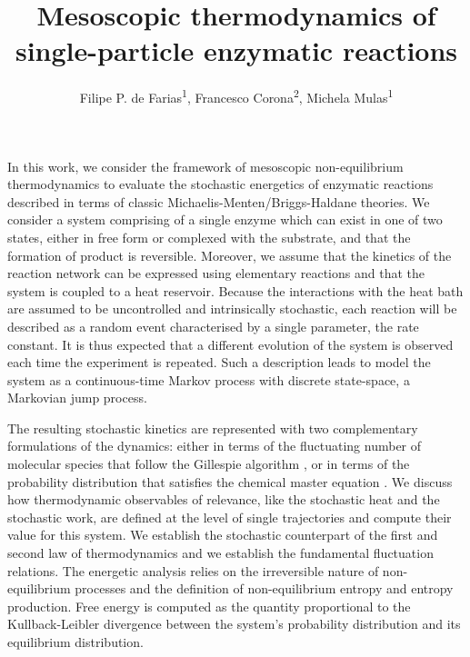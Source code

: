 \documentclass[11pt]{amsart}
\title{Mesoscopic thermodynamics of \\ single-particle enzymatic reactions}
\author{Filipe P. de Farias\textsuperscript{1}, Francesco Corona\textsuperscript{2}, Michela Mulas\textsuperscript{1}}
\begin{document}
\maketitle

\vskip-0.250cm
In this work, we consider the framework of mesoscopic non-equilibrium thermodynamics \cite{Prigogine1953,Mazur1998,Reguera2005} to evaluate the stochastic energetics of enzymatic reactions described in terms of classic Michaelis-Menten/Briggs-Haldane theories. We consider a system comprising of a single enzyme which can exist in one of two states, either in free form or complexed with the substrate, and that the formation of product is reversible. Moreover, we assume that the kinetics of the reaction network can be expressed using elementary reactions and that the system is coupled to a heat reservoir. Because the interactions with the heat bath are assumed to be uncontrolled and intrinsically stochastic, each reaction will be described as a random event characterised by a single parameter, the rate constant. It is thus expected that a different evolution of the system is observed each time the experiment is repeated. Such a description leads to model the system as a continuous-time Markov process with discrete state-space, a Markovian jump process. 

The resulting stochastic kinetics are represented with two complementary formulations of the dynamics: either in terms of the fluctuating number of molecular species that follow the Gillespie algorithm \cite{Gillespie1976}, or in terms of the probability distribution that satisfies the chemical master equation \cite{Gillespie1992}. We discuss how thermodynamic observables of relevance, like the stochastic heat and the stochastic work, are defined at the level of single trajectories and compute their value for this system. We establish the stochastic counterpart of the first and second law of thermodynamics and we establish the fundamental fluctuation relations. The energetic analysis relies on the irreversible nature of non-equilibrium processes and the definition of non-equilibrium entropy and entropy production. Free energy is computed as the quantity proportional to the Kullback-Leibler divergence between the system's probability distribution and its equilibrium distribution.




\end{document}
